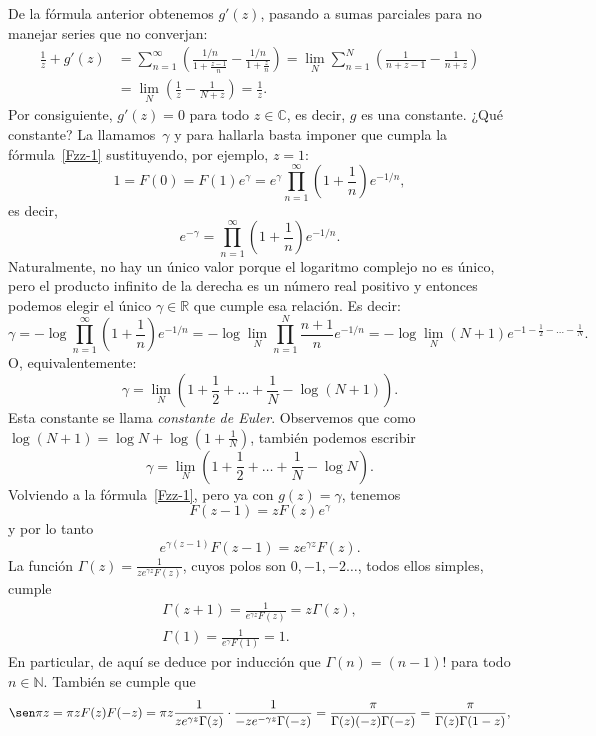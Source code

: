 \documentclass[11pt]{book}
\theoremstyle{plain} %
\theoremstyle{definition} %
\newcommand\N{\mathbb{N}}
\newcommand\R{\mathbb{R}}
\newcommand\C{\mathbb{C}}
\begin{document}
De la fórmula anterior obtenemos $g'(z)$, pasando a sumas parciales para no 
manejar series que no converjan:
\begin{align*}
   \frac{1}{z} + g'(z)
   &= \sum_{n=1}^\infty
   \left( \frac{1/n}{1 + \frac{z-1}{n}} - \frac{1/n}{1 + \frac{z}{n}} \right)
   = \lim_N \sum_{n=1}^N
   \left( \frac{1}{n + z-1} - \frac{1}{n + z} \right)
   \\
   &= \lim_N \left( \frac{1}{z} - \frac{1}{N + z} \right)
   = \frac{1}{z}.
\end{align*}
Por consiguiente, $g'(z) = 0$ para todo $z \in \C$, es decir, $g$ es una 
constante. ¿Qué constante? La llamamos~$\gamma$ y para hallarla basta imponer que 
cumpla la fórmula~\eqref{Fzz-1} sustituyendo, por ejemplo, $z=1$:
\[
   1 = F(0) = F(1) e^\gamma 
   = e^\gamma \prod_{n=1}^\infty \left(1 + \frac{1}{n}\right) e^{-1/n},
\]
es decir,
\[
   e^{-\gamma} = \prod_{n=1}^\infty \left(1 + \frac{1}{n}\right) e^{-1/n}.
\]
Naturalmente, no hay un único valor porque el logaritmo complejo no es único, 
pero el producto infinito de la derecha es un número real positivo y entonces 
podemos elegir el único $\gamma \in \R$ que cumple esa relación. Es decir:
\[
   \gamma = - \log \prod_{n=1}^\infty \left(1 + \frac{1}{n}\right) e^{-1/n}
   = - \log \lim_N \prod_{n=1}^N \frac{n+1}{n} e^{-1/n}
   = - \log \lim_N (N+1) e^{-1 - \frac{1}{2} - \ldots - \frac{1}{N}}.
\]
O, equivalentemente:
\[
   \gamma = \lim_N \left(
   1 + \frac{1}{2} + \dots + \frac{1}{N} - \log(N+1)
   \right).
\]
Esta constante se llama \emph{constante de Euler}. 
Observemos que como $\log (N+1) = \log N + \log (1 + \frac{1}{N})$, también 
podemos escribir
\begin{equation}
\label{gamma}
   \gamma = \lim_N \left(
   1 + \frac{1}{2} + \dots + \frac{1}{N} - \log N
   \right).
\end{equation}
Volviendo a la fórmula~\eqref{Fzz-1}, pero ya con $g(z) = \gamma$, tenemos
\[
   F(z-1) = z F(z) e^\gamma
\]
y por lo tanto
\[
   e^{\gamma(z-1)} F(z-1) = z e^{\gamma z} F(z).
\]
La función $\Gamma(z) = \frac{1}{z e^{\gamma z} F(z)}$, cuyos polos son $0, -1, 
-2 \dots$, todos ellos simples, cumple
\begin{gather*}
   \Gamma(z+1) = \frac{1}{e^{\gamma z} F(z)} = z \Gamma(z),
   \\
   \Gamma(1) = \frac{1}{e^\gamma F(1)} = 1.
\end{gather*}
En particular, de aquí se deduce por inducción que $\Gamma(n) = (n-1)!$ para todo 
$n \in \N$. También se cumple que
\[
   \sen \pi z = \pi z F(z) F(-z)
   = \pi z \frac{1}{z e^{\gamma z} \Gamma(z)} 
   \cdot \frac{1}{-z e^{-\gamma z} \Gamma(-z)}
   = \frac{\pi}{\Gamma(z) (-z) \Gamma(-z)}
   = \frac{\pi}{\Gamma(z) \Gamma(1-z)},
\]
\end{document}
